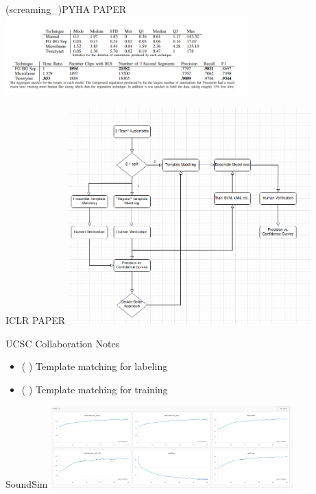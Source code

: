 \begin{frame}{(screaming_)PYHA PAPER}
    \centering
    \includegraphics[height=0.7\textheight,width=0.7\textwidth,keepaspectratio]{model_performance_01_23.png}
\end{frame}

\begin{frame}{ICLR PAPER}
    \centering
    \includegraphics[height=0.7\textheight,width=0.7\textwidth,keepaspectratio]{ICLR_WORKFLOW.png}
\end{frame}

\begin{frame}{UCSC Collaboration Notes}
    \begin{itemize}
        \item ( ) Template matching for labeling
        \item ( ) Template matching for training
    \end{itemize}    
\end{frame}

\begin{frame}{SoundSim}
    \centering
    \includegraphics[height=0.7\textheight,width=0.7\textwidth,keepaspectratio]{sound_sim_baseline.png}
\end{frame}

